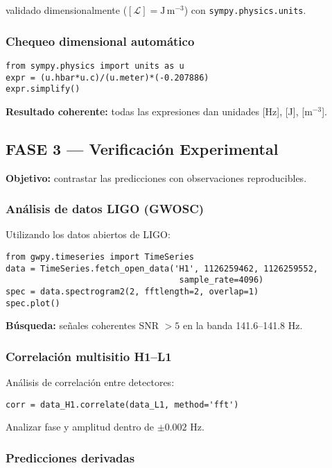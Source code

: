 validado dimensionalmente ($[\mathcal{L}] = \text{J}\,\text{m}^{-3}$) con \texttt{sympy.physics.units}.

\subsubsection{Chequeo dimensional automático}

\begin{verbatim}
from sympy.physics import units as u
expr = (u.hbar*u.c)/(u.meter)*(-0.207886)
expr.simplify()
\end{verbatim}

\textbf{Resultado coherente:} todas las expresiones dan unidades [Hz], [J], [m$^{-3}$].

\subsection{FASE 3 — Verificación Experimental}

\textbf{Objetivo:} contrastar las predicciones con observaciones reproducibles.

\subsubsection{Análisis de datos LIGO (GWOSC)}

Utilizando los datos abiertos de LIGO:

\begin{verbatim}
from gwpy.timeseries import TimeSeries
data = TimeSeries.fetch_open_data('H1', 1126259462, 1126259552, 
                                   sample_rate=4096)
spec = data.spectrogram2(2, fftlength=2, overlap=1)
spec.plot()
\end{verbatim}

\textbf{Búsqueda:} señales coherentes SNR $> 5$ en la banda 141.6--141.8 Hz.

\subsubsection{Correlación multisitio H1--L1}

Análisis de correlación entre detectores:

\begin{verbatim}
corr = data_H1.correlate(data_L1, method='fft')
\end{verbatim}

Analizar fase y amplitud dentro de $\pm 0.002$ Hz.

\subsubsection{Predicciones derivadas}

